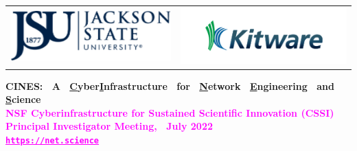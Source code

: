 \documentclass[landscape,paperwidth=70in,paperheight=46in,fontscale=0.225]{baposter} %
\begin{document}
\begin{poster}
{\begin{tabular}{c c}
\includegraphics[scale=0.4]{logos/jsu.png} &
\includegraphics[scale=0.4]{logos/kitware.png} \\
\end{tabular}
}
{\textbf{CINES:~ A~ \underline{C}yber\underline{I}nfrastructure~ for~ \underline{N}etwork~ \underline{E}ngineering~ and~ \underline{S}cience} \\
\vspace{-3mm}
{
           \textcolor{magenta}{%
               {\textbf{\Large{NSF Cyberinfrastructure for Sustained Scientific Innovation (CSSI) Principal Investigator Meeting,~ July 2022}}}} \\
               \vspace{2.5mm}
                 \textbf{\Large{\textcolor{magenta}{\texttt{\underline{https://net.science}}}}}            
            } }%
            

\end{poster}
\end{document}
